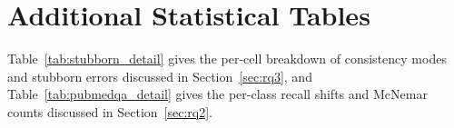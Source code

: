 \documentclass[sigconf,nonacm]{acmart}
\makeatletter
\DeclareRobustCommand{\_}{\ifmmode\nfss@text{\textunderscore}\else\textunderscore\allowbreak\fi}
\newcommand{\fitwidth}[2]{%
  \sbox{\fitbox}{#2}%
  \ifdim\wd\fitbox>#1\relax
    \resizebox{#1}{!}{\usebox{\fitbox}}%
  \else
    \usebox{\fitbox}%
  \fi}
\makeatother
\begin{document}
\section{Additional Statistical Tables}
Table~\ref{tab:stubborn_detail} gives the per-cell breakdown of consistency modes and stubborn errors discussed in Section~\ref{sec:rq3}, and Table~\ref{tab:pubmedqa_detail} gives the per-class recall shifts and McNemar counts discussed in Section~\ref{sec:rq2}.

\begin{table}[!t]
\centering
\caption{Detailed breakdown of stubborn confident errors and consistency modes across all 15 cells.}
\label{tab:stubborn_detail}
\small
\setlength{\tabcolsep}{3.5pt}
\fitwidth{\textwidth}{}
\end{table}

\begin{table}[!t]
\centering
\caption{PubMedQA deep dive: class recall shifts and McNemar test breakdown.}
\label{tab:pubmedqa_detail}
\small
\setlength{\tabcolsep}{3.5pt}
\fitwidth{\textwidth}{}
\end{table}
\end{document}

